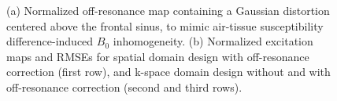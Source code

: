 \documentclass[11pt]{article}
\begin{document}
\begin{figure}
	\centering
	\caption{
	(a) Normalized off-resonance map containing a Gaussian distortion centered above the frontal sinus, 
	to mimic air-tissue susceptibility difference-induced $B_0$ inhomogeneity.
	(b) Normalized excitation maps and RMSEs for spatial domain design with off-resonance correction (first row), 
	and k-space domain design without and with off-resonance correction (second and third rows).}
	\label{fig:kspace_PTX_B0}
\end{figure}
\end{document}
